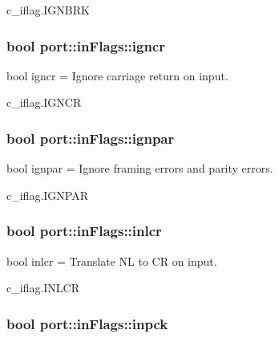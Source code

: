c\+\_\+iflag.\+I\+G\+N\+B\+RK
\subsubsection[{\texorpdfstring{igncr}{igncr}}]{\setlength{\rightskip}{0pt plus 5cm}bool port\+::in\+Flags\+::igncr}\hypertarget{classport_1_1inFlags_ae51c5a4ba8887f6d52e3f868e7bf341c}{}\label{classport_1_1inFlags_ae51c5a4ba8887f6d52e3f868e7bf341c}


bool igncr = Ignore carriage return on input. 

c\+\_\+iflag.\+I\+G\+N\+CR
\subsubsection[{\texorpdfstring{ignpar}{ignpar}}]{\setlength{\rightskip}{0pt plus 5cm}bool port\+::in\+Flags\+::ignpar}\hypertarget{classport_1_1inFlags_acee23afe5adf90a8f50ad190eb30e70c}{}\label{classport_1_1inFlags_acee23afe5adf90a8f50ad190eb30e70c}


bool ignpar = Ignore framing errors and parity errors. 

c\+\_\+iflag.\+I\+G\+N\+P\+AR
\subsubsection[{\texorpdfstring{inlcr}{inlcr}}]{\setlength{\rightskip}{0pt plus 5cm}bool port\+::in\+Flags\+::inlcr}\hypertarget{classport_1_1inFlags_a934afcf2cf7cf062762fb7dac1cbadc5}{}\label{classport_1_1inFlags_a934afcf2cf7cf062762fb7dac1cbadc5}


bool inlcr = Translate NL to CR on input. 

c\+\_\+iflag.\+I\+N\+L\+CR
\subsubsection[{\texorpdfstring{inpck}{inpck}}]{\setlength{\rightskip}{0pt plus 5cm}bool port\+::in\+Flags\+::inpck}\hypertarget{classport_1_1inFlags_af29fc919bb4310b36924ba6e3de5cda8}{}\label{classport_1_1inFlags_af29fc919bb4310b36924ba6e3de5cda8}


